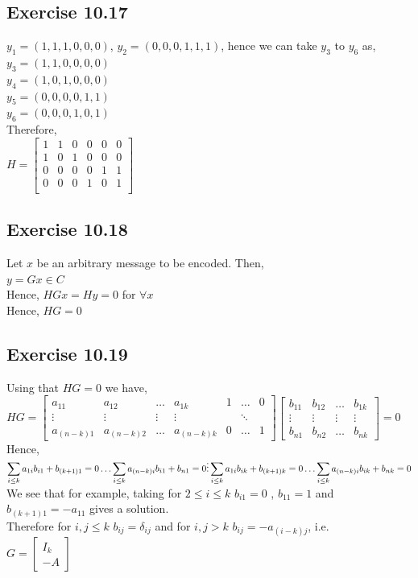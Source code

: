 \documentclass[a4paper,12pt]{article}
\begin{document}
\subsection*{Exercise 10.17}
$y_1=(1,1,1,0,0,0)$, $y_2=(0,0,0,1,1,1)$, hence we can take $y_3$ to $y_6$ as,\\
$y_3=(1,1,0,0,0,0)$\\
$y_4=(1,0,1,0,0,0)$\\
$y_5=(0,0,0,0,1,1)$\\
$y_6=(0,0,0,1,0,1)$\\
Therefore,\\
$H=\begin{bmatrix}
    1&1&0&0&0&0\\
    1&0&1&0&0&0\\
    0&0&0&0&1&1\\
    0&0&0&1&0&1\\
\end{bmatrix}$
\newpage
\subsection*{Exercise 10.18}
Let $x$ be an arbitrary message to be encoded. Then,\\
$y=Gx\in C$\\
Hence,
$HGx=Hy=0$ for $\forall x$\\
Hence,
$HG=0$
\subsection*{Exercise 10.19}
Using that $HG=0$ we have,\\
$HG=\begin{bmatrix}
    a_{11}& a_{12} &\ldots&a_{1k}&1& \ldots &0\\
    \vdots &\vdots &\vdots &\vdots & &\ddots &\\
    a_{(n-k)1}& a_{(n-k)2} &\ldots&a_{(n-k)k}&0 &\ldots &1
\end{bmatrix}
\begin{bmatrix}
    b_{11}&b_{12}&\ldots&b_{1k}\\
    \vdots &\vdots &\vdots &\vdots\\
    b_{n1}&b_{n2}&\ldots&b_{nk}
\end{bmatrix}=0$\\
Hence,\\
$\displaystyle\sum_{i\leq k}a_{1i}b_{i1}+b_{(k+1)1}=0
\ldots
\displaystyle\sum_{i\leq k}a_{(n-k)i}b_{i1}+b_{n1}=0\\
\vdots\\
\displaystyle\sum_{i\leq k}a_{1i}b_{ik}+b_{(k+1)k}=0
\ldots
\displaystyle\sum_{i\leq k}a_{(n-k)i}b_{ik}+b_{nk}=0$\\
We see that for example, taking for $2\leq i \leq k$ $b_{i1}=0$ , $b_{11}=1$ and $b_{(k+1)1}=-a_{11}$
gives a solution.\\
Therefore for $i,j\leq k$ $b_{ij}=\delta_{ij}$ and for $i,j>k$ $b_{ij}=-a_{(i-k)j}$, i.e.\\
$G=\left[\begin{array}{c}
    I_k\\ \hline
    -A
    \end{array}\right]$
\end{document}
